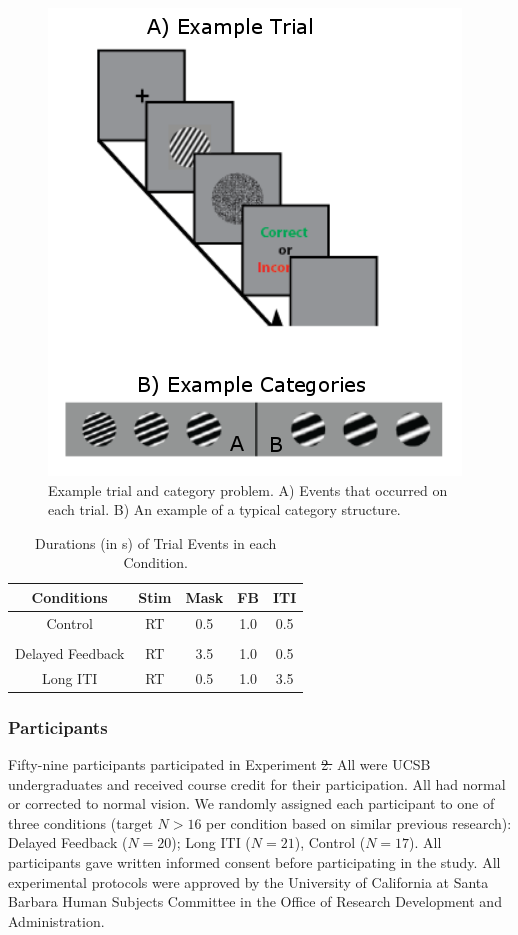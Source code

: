 \documentclass[doc, floatsintext]{apa7}
\providecommand{\DIFadd}[1]{{\protect\color{blue}\uwave{#1}}} %
\providecommand{\DIFdel}[1]{{\protect\color{red}\sout{#1}}}                      %
\providecommand{\DIFaddbegin}{} %
\providecommand{\DIFaddend}{} %
\providecommand{\DIFdelbegin}{} %
\providecommand{\DIFdelend}{} %
\newcommand{\DIFscaledelfig}{0.5}
\newlength{\DIFdelgraphicswidth} %
\newlength{\DIFdelgraphicsheight} %
\newcommand{\DIFaddincludegraphics}[2][]{{\color{blue}\fbox{\DIFOincludegraphics[#1]{#2}}}} %
\newcommand{\DIFdelincludegraphics}[2][]{%
\sbox{\DIFdelgraphicsbox}{\DIFOincludegraphics[#1]{#2}}%
\settoboxwidth{\DIFdelgraphicswidth}{\DIFdelgraphicsbox} %
\settoboxtotalheight{\DIFdelgraphicsheight}{\DIFdelgraphicsbox} %
\scalebox{\DIFscaledelfig}{%
\parbox[b]{\DIFdelgraphicswidth}{\usebox{\DIFdelgraphicsbox}\\[-\baselineskip] \rule{\DIFdelgraphicswidth}{0em}}\llap{\resizebox{\DIFdelgraphicswidth}{\DIFdelgraphicsheight}{%
\setlength{\unitlength}{\DIFdelgraphicswidth}%
\begin{picture}(1,1)%
\thicklines\linethickness{2pt} %
{\color[rgb]{1,0,0}\put(0,0){\framebox(1,1){}}}%
{\color[rgb]{1,0,0}\put(0,0){\line( 1,1){1}}}%
{\color[rgb]{1,0,0}\put(0,1){\line(1,-1){1}}}%
\end{picture}%
}\hspace*{3pt}}} %
} %
\DeclareRobustCommand{\DIFaddbegin}{\DIFOaddbegin \let\includegraphics\DIFaddincludegraphics} %
\DeclareRobustCommand{\DIFaddend}{\DIFOaddend \let\includegraphics\DIFOincludegraphics} %
\DeclareRobustCommand{\DIFdelbegin}{\DIFOdelbegin \let\includegraphics\DIFdelincludegraphics} %
\DeclareRobustCommand{\DIFdelend}{\DIFOaddend \let\includegraphics\DIFOincludegraphics} %
\begin{document}
\begin{figure}
  \centering
  \includegraphics[width=.5\textwidth]{../figures/fig_design_exp_1.png}
  \caption{
      Example trial and category problem. A) Events that
      occurred on each trial. B) An example of a typical
      category structure.
}
  \label{fig:trial}
\end{figure}

\begin{table}
    \caption{
        Durations (in s) of Trial Events in each Condition.
    }
    \label{conditions_exp_1}
    \begin{tabular}{c|cccc}
        Conditions & Stim & Mask & FB & ITI \\[0.5ex] \hline Control & RT & 0.5 &
        1.0 & 0.5 \\[0.5ex]
        \\[-1.5ex] Delayed Feedback &
        RT & 3.5 & 1.0 & 0.5 \\[0.5ex]   Long ITI & RT & 0.5 & 1.0 & 3.5
        \\[0.5ex]
    \end{tabular}
\end{table}

\subsubsection{Participants}
Fifty-nine participants participated in Experiment \DIFdelbegin \DIFdel{2. }\DIFdelend \DIFaddbegin \DIFadd{1. }\DIFaddend All
were UCSB undergraduates and received course credit for
their participation. All had normal or corrected to normal
vision. We randomly assigned each participant to one of
three conditions (target $N>16$ per condition based on
similar previous research): Delayed Feedback ($N = 20$);
Long ITI ($N = 21$), Control ($ N = 17$). All participants
gave written informed consent before participating in the
study. All experimental protocols were approved by the
University of California at Santa Barbara Human Subjects
Committee in the Office of Research Development and
Administration.
\end{document}
